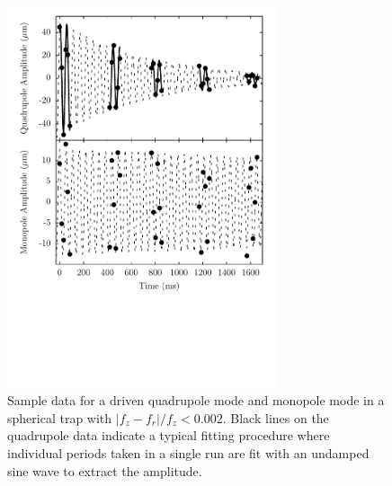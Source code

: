 \documentclass[%
 reprint,
 amsmath,amssymb,
 aps,
]{revtex4-1}
\begin{document}
\begin{figure}[htb]

    \begin{center}
    \includegraphics[width=80mm]{./figs/725QuadMonoStackedSHORT7.pdf}
    \end{center}
    \caption[damhere]{
        Sample data for a driven quadrupole mode and monopole mode in a spherical trap with $\vert f_z-f_r\vert/f_z < 0.002$.
        Black lines on the quadrupole data indicate a typical fitting procedure where individual periods taken in a single run are fit with an undamped sine wave to extract the amplitude.
    }
    \label{fig:quadbreathe}
\end{figure}
\end{document}
